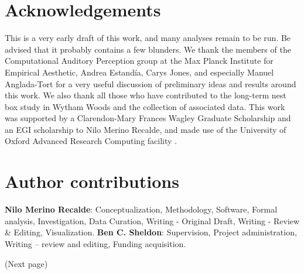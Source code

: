 \section{Acknowledgements}
This is a very early draft of this work, and many analyses remain to be run. Be advised that it probably contains a few blunders. We thank the members of the Computational Auditory Perception group at the Max Planck Institute for Empirical Aesthetic, Andrea Estandía, Carys Jones, and especially Manuel Anglada-Tort for a very useful discussion of preliminary ideas and results around this work. We also thank all those who have contributed to the long-term nest box study in Wytham Woods and the collection of associated data. This work was supported by a Clarendon-Mary Frances Wagley Graduate Scholarship and an EGI scholarship to Nilo Merino Recalde, and made use of the University of Oxford Advanced Research Computing facility \parencite{richards2015}.

\section{Author contributions}

\textbf{Nilo Merino Recalde}: Conceptualization, Methodology, Software, Formal analysis, Investigation, Data Curation, Writing - Original Draft, Writing - Review \& Editing, Visualization. 
\textbf{Ben C. Sheldon}: Supervision, Project administration, Writing -- review and editing, Funding acquisition.

\renewcommand{\cleardoublepage}{}
\renewcommand{\clearpage}{}
\printbibliography

\renewcommand{\cleardoublepage}{}
\renewcommand{\clearpage}{}
\supplementarysection
\noindent (Next page)

